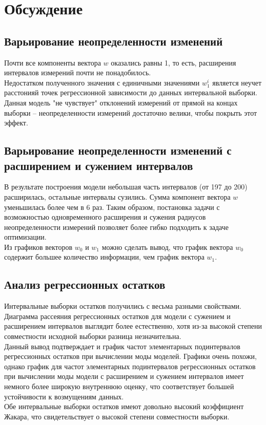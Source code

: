 \section{Обсуждение}

\subsection{Варьирование неопределенности изменений}

Почти все компоненты вектора $w$ оказались равны 1, то есть, расширения интервалов измерений почти не понадобилось. \\
Недостатком полученного значения с единичными значениями $w_{1}^i$ является неучет расстонияй точек регрессионной зависимости до данных интервальной выборки. Данная модель "не чувствует" отклонений измерений от прямой на концах выборки -- неопределенности измерений достаточно велики, чтобы покрыть этот эффект.

\subsection{Варьирование неопределенности изменений с расширением и сужением интервалов}

В результате построения модели небольшая часть интервалов (от 197 до 200) расширилась, остальные интервалы сузились. Сумма компонент вектора $w$ уменьшилась более чем в 6 раз. Таким образом, постановка задачи с возможностью одновременного расширения и сужения радиусов неопределенности измерений позволяет более гибко подходить к задаче оптимизации. \\
Из графиков векторов $w_0$ и $w_1$ можно сделать вывод, что график вектора $w_0$ содержит большее количество информации, чем график вектора $w_1$.\\

\subsection{Анализ регрессионных остатков}

Интервальные выборки остатков получились с весьма разными свойствами. Диаграмма рассеяния регрессионных остатков для модели с сужением и расширением интервалов выглядит более естественно, хотя из-за высокой степени совместности исходной выборки разница незначительна. \\
Данный вывод подтверждает и график частот элементарных подинтервалов регрессионных остатков при вычислении моды моделей. Графики очень похожи, однако график для частот элементарных подинтервалов регрессионных остатков при вычислении моды модели с расширением и сужением интервалов имеет немного более широкую внутреннюю оценку, что соответствует большей устойчивости к возмущениям данных.\\
Обе интервальные выборки остатков имеют довольно высокий коэффициент Жакара, что свидетельствует о высокой степени совместности выборки. 

